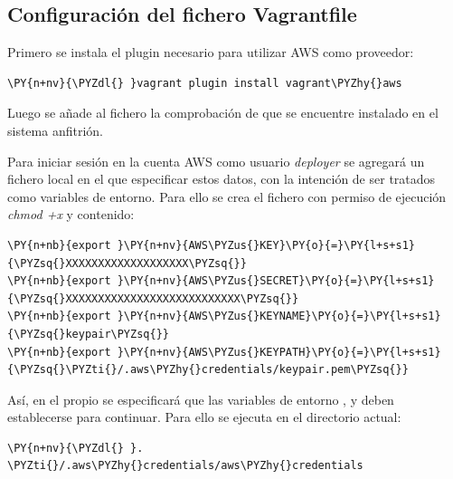 \subsection{Configuración del fichero Vagrantfile}

Primero se instala el plugin necesario para utilizar AWS como proveedor:

\begin{framed_shaded}
\begin{Verbatim}[fontsize=\relsize{-2.5},fontseries=b,commandchars=\\\{\}]
\PY{n+nv}{\PYZdl{} }vagrant plugin install vagrant\PYZhy{}aws
\end{Verbatim}
\end{framed_shaded}

Luego se añade al fichero  la comprobación de que se encuentre instalado en el sistema anfitrión.

Para iniciar sesión en la cuenta AWS como usuario \textit{deployer} se agregará un fichero local en el que especificar estos datos, con la intención de ser tratados como variables de entorno. Para ello se crea el fichero  con permiso de ejecución \textit{chmod +x} y contenido:

\begin{codelisting}
\label{code:vagrantfile2}
\begin{Verbatim}[fontsize=\relsize{-2.5},fontseries=b,commandchars=\\\{\}]
\PY{n+nb}{export }\PY{n+nv}{AWS\PYZus{}KEY}\PY{o}{=}\PY{l+s+s1}{\PYZsq{}XXXXXXXXXXXXXXXXXXX\PYZsq{}}
\PY{n+nb}{export }\PY{n+nv}{AWS\PYZus{}SECRET}\PY{o}{=}\PY{l+s+s1}{\PYZsq{}XXXXXXXXXXXXXXXXXXXXXXXXXXX\PYZsq{}}
\PY{n+nb}{export }\PY{n+nv}{AWS\PYZus{}KEYNAME}\PY{o}{=}\PY{l+s+s1}{\PYZsq{}keypair\PYZsq{}}
\PY{n+nb}{export }\PY{n+nv}{AWS\PYZus{}KEYPATH}\PY{o}{=}\PY{l+s+s1}{\PYZsq{}\PYZti{}/.aws\PYZhy{}credentials/keypair.pem\PYZsq{}}
\end{Verbatim}
\end{codelisting}

Así, en el propio  se especificará que las variables de entorno ,  y  deben establecerse para continuar. Para ello se ejecuta en el directorio actual:

\begin{framed_shaded}
\begin{Verbatim}[fontsize=\relsize{-2.5},fontseries=b,commandchars=\\\{\}]
\PY{n+nv}{\PYZdl{} }. \PYZti{}/.aws\PYZhy{}credentials/aws\PYZhy{}credentials
\end{Verbatim}
\end{framed_shaded}

